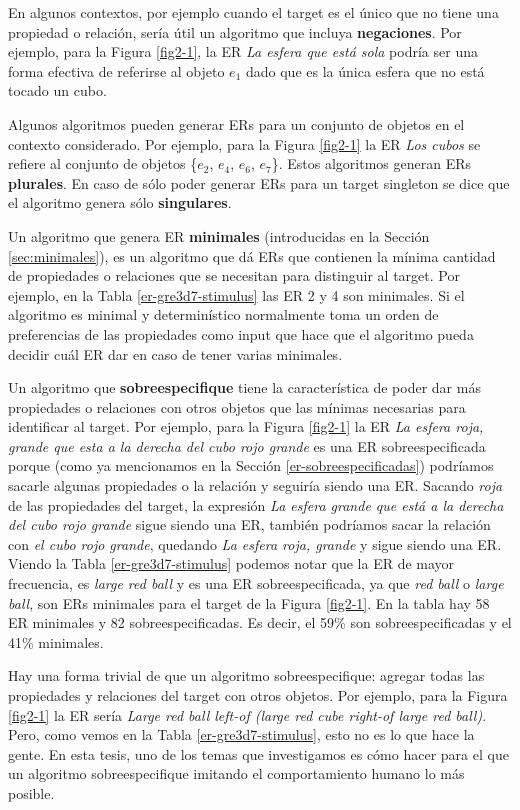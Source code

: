 En algunos contextos, por ejemplo cuando el target es el \'unico que no tiene una propiedad o relaci\'on, ser\'ia \'util un algoritmo que incluya {\bf negaciones}. Por ejemplo, para la Figura \ref{fig2-1}, la ER {\it La esfera que est\'a sola} podr\'ia ser 
una forma efectiva de referirse al objeto $e_1$ dado que es la \'unica esfera que no est\'a tocado un cubo.

Algunos algoritmos pueden generar ERs para un conjunto de objetos en el contexto considerado. Por ejemplo, para la Figura \ref{fig2-1} la ER {\it Los cubos} se refiere  al conjunto de objetos \{$e_2$, $e_4$, $e_6$, $e_7$\}. Estos algoritmos generan ERs {\bf plurales}. En caso de s\'olo poder generar ERs para un target singleton se dice que el algoritmo genera s\'olo {\bf singulares}.

Un algoritmo que genera ER {\bf minimales} (introducidas en la Secci\'on \ref{sec:minimales}), es un algoritmo que d\'a ERs que contienen la m\'inima cantidad de propiedades o relaciones que se necesitan para distinguir al target. Por ejemplo, en la Tabla \ref{er-gre3d7-stimulus} las ER 2 y 4 son minimales. Si el algoritmo es minimal y determin\'istico normalmente toma un orden de preferencias de las propiedades como input que hace que el algoritmo pueda decidir cu\'al ER dar en caso de tener varias minimales.

Un algoritmo que {\bf sobreespecifique} tiene la caracter\'istica de poder dar m\'as propiedades o relaciones con otros objetos que las m\'inimas necesarias para identificar al target. Por ejemplo, para la Figura \ref{fig2-1} la ER {\it La esfera roja, grande que esta a la derecha del cubo rojo grande} es una ER sobreespecificada porque (como ya mencionamos en la Secci\'on \ref{er-sobreespecificadas}) podr\'iamos sacarle algunas propiedades o la relaci\'on y seguir\'ia siendo una ER. Sacando {\it roja} de las propiedades del target, la expresi\'on {\it La esfera grande que est\'a a la derecha del cubo rojo grande} sigue siendo una ER, tambi\'en podr\'iamos sacar la relaci\'on con {\it el cubo rojo grande}, quedando {\it La esfera roja, grande} y sigue siendo una ER. Viendo la Tabla \ref{er-gre3d7-stimulus} podemos notar que la ER de mayor frecuencia, es {\it large red ball} y es una ER sobreespecificada, ya que {\it red ball} o {\it large ball}, son ERs minimales para el target de la Figura \ref{fig2-1}. En la tabla hay 58 ER minimales y 82 sobreespecificadas. Es decir, el 59\% son sobreespecificadas y el 41\% minimales.

Hay una forma trivial de que un algoritmo sobreespecifique: agregar todas las propiedades y relaciones del target con otros objetos. Por ejemplo, para la Figura \ref{fig2-1} la ER ser\'ia {\it Large red ball left-of (large red cube right-of large red ball)}. Pero, como vemos en la Tabla \ref{er-gre3d7-stimulus}, esto no es lo que hace la gente. En esta tesis, uno de los temas que investigamos es c\'omo hacer para el que un algoritmo sobreespecifique imitando el comportamiento humano lo m\'as posible. 

